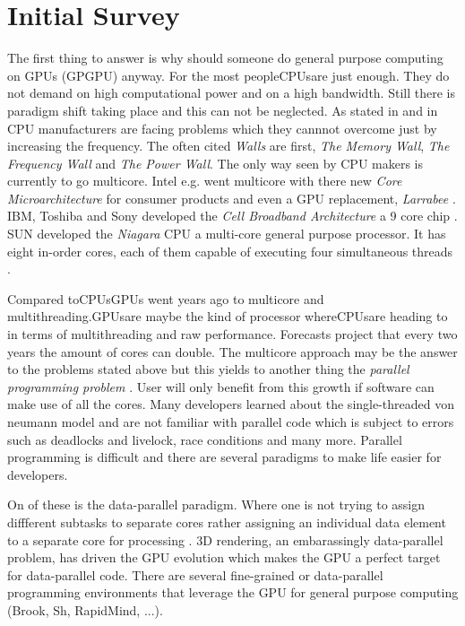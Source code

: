 \section*{Initial Survey} 
\label{sub:initial_survey} 
The first thing to answer is why should someone do general purpose computing on
GPUs (GPGPU) anyway. For the most people\glspl{CPU}are just enough. They do not
demand on high computational power and on a high bandwidth. Still there is
paradigm shift taking place and this can not be neglected. As stated in
\citep{citeulike:1187394} and in \citep{citeulike:3421647} CPU manufacturers are
facing problems which they cannnot overcome just by increasing the frequency.
The often cited \emph{Walls} are first, \emph{The Memory
Wall}\citep{citeulike:457955}, \emph{The Frequency Wall} and \emph{The Power
Wall}. The only way seen by CPU makers is currently to go multicore. Intel e.g.
went multicore with there new \emph{Core Microarchitecture} for consumer
products and even a \gls{GPU} replacement, \emph{Larrabee} \citep{citeulike:3153758}.
IBM, Toshiba and Sony developed the \emph{Cell Broadband Architecture} a 9 core
chip \citep{citeulike:1243173}. SUN developed the \emph{Niagara} CPU a multi-core
general purpose processor. It has eight in-order cores, each of them capable of
executing four simultaneous threads \citep{citeulike:3743958}.

Compared to\glspl{CPU}GPUs went years ago to multicore and multithreading.\glspl{GPU}are
maybe the kind of processor where\glspl{CPU}are heading to in terms of multithreading
and raw performance. Forecasts project that every two years the amount of cores
can double. The multicore approach may be the answer to the problems stated
above but this yields to another thing the \emph{parallel programming problem}
\citep{citeulike:3750573}. User will only benefit from this growth if software
can make use of all the cores. Many developers learned about the
single-threaded von neumann model and are not familiar with parallel code which
is subject to errors such as deadlocks and livelock, race conditions and many
more. Parallel programming is difficult and there are several paradigms to make
life easier for developers. 

On of these is the data-parallel paradigm. Where one
is not trying to assign diffferent subtasks to separate cores rather assigning
an individual data element to a separate core for processing
\citep{citeulike:3750565}. 3D rendering, an embarassingly data-parallel problem,
has driven the \gls{GPU} evolution which makes the \gls{GPU} a perfect target for
data-parallel code. There are several fine-grained or data-parallel programming
environments that leverage the \gls{GPU} for general purpose computing (Brook, Sh,
RapidMind, ...). 

